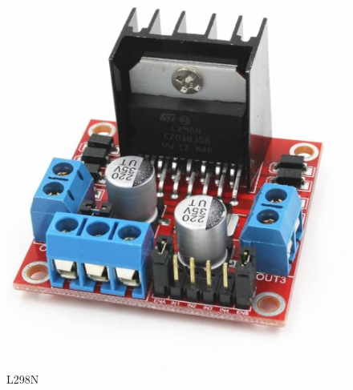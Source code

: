 {	
	\begin{figure}[H]
		\centering
		\includegraphics[scale=0.18]{images/Content/l298n}
		\caption{L298N}
		\label{fig:l298n}
	\end{figure}
}

